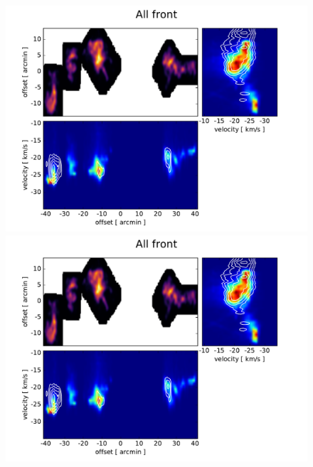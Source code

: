 \documentclass[traditabstract]{aa}
\begin{document}
\begin{figure}[h]
  \centering
  \includegraphics[page=7,width=14cm,trim=30 10 55 30,clip=true]{Figures/PV_diagrams.pdf} \\
  \includegraphics[page=3,width=14cm,trim=30 10 55 30,clip=true]{Figures/PV_diagrams.pdf}
  \caption{}
\end{figure}

\end{document}
